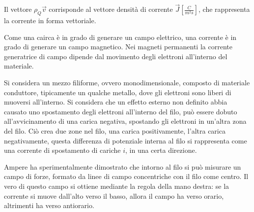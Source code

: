 \documentclass{article}
\numberwithin{equation}{subsection}
\begin{document}
Il vettore $\rho_Q\vec{v}$ corrisponde al vettore densità di corrente $\vec{J}\displaystyle\left[\frac{C}{m^2s}\right]$, che rappresenta la corrente in forma vettoriale. 



Come una cairca è in grado di generare un campo elettrico, una corrente è in grado di generare un campo magnetico. Nei magneti permanenti la corrente generatrice di campo 
dipende dal movimento degli elettroni all'interno del materiale. 

Si considera un mezzo filiforme, ovvero monodimensionale, composto di materiale conduttore, tipicamente un qualche 
metallo, dove gli elettroni sono liberi di muoversi all'interno. Si considera che un effetto esterno non definito abbia causato uno spostamento degli elettroni all'interno del filo, 
può essere dobuto all'avvicinamento di una carica negativa, spostando gli elettroni in un'altra zona del filo. Ciò crea due zone nel filo, una carica positivamente, l'altra 
carica negativamente, questa differenza di potenziale interna al filo si rappresenta come una corrente di spostamento di cariche $i$, in una certa direzione. 

Ampere ha sperimentalmente dimostrato che intorno al filo si può misurare un campo di forze, formato da linee di campo concentriche con il filo come centro. Il vero di questo 
campo si ottiene mediante la regola della mano destra: se la corrente si muove dall'alto verso il basso, allora il campo ha verso orario, altrimenti ha verso antiorario. 

\begin{center}
\end{center}
\end{document}
